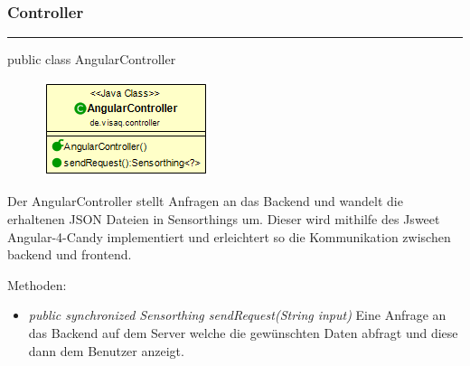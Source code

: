 \subsubsection{Controller}

\rule{\textwidth}{0.4pt}
public class AngularController

\begin{minipage}{0.4\textwidth}
    \begin{figure}[H]
        {\centering\includegraphics[scale = 0.7]{media/frontend/controller/AngularController_Class.png}}
    \end{figure}
    \end{minipage} \hfill
    \begin{minipage}{0.6\textwidth}
Der AngularController stellt Anfragen an das Backend und wandelt die erhaltenen JSON Dateien in Sensorthings um. Dieser wird mithilfe des \gls{Jsweet} \gls{Angular-4-Candy} implementiert und erleichtert so die Kommunikation zwischen backend und frontend.
\end{minipage}
Methoden: \begin{itemize}
    \item \emph{public synchronized Sensorthing sendRequest(String input)} Eine Anfrage an das Backend auf dem Server welche die gewünschten Daten abfragt und diese dann dem Benutzer anzeigt.
\end{itemize}
